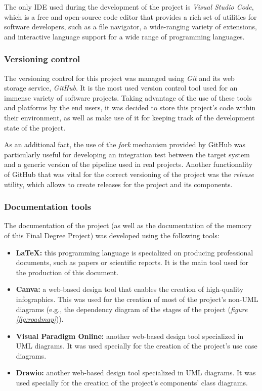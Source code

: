 The only \acrshort{IDE} used during the development of the project is \emph{Visual Studio Code}, which is a free and open-source code editor that provides a rich set of utilities
for software developers, such as a file navigator, a wide-ranging variety of extensions, and interactive language support for a wide range of programming languages.

\subsubsection{Versioning control}

The versioning control for this project was managed using \emph{Git} and its web storage service, \emph{GitHub}. It is the most used version control tool used for an immense variety of
software projects. Taking advantage of the use of these tools and platforms by the end users, it was decided to store this project's code within their environment, as well as make use of
it for keeping track of the development state of the project. 

As an additional fact, the use of the \emph{fork} mechanism provided by GitHub was particularly useful for developing an integration
test between the target system and a generic version of the pipeline used in real projects. Another functionality of GitHub that was vital for the correct versioning of the project was the
\emph{release} utility, which allows to create releases for the project and its components.

\subsubsection{Documentation tools}

The documentation of the project (as well as the documentation of the memory of this Final Degree Project) was developed using the following tools:

\begin{itemize}
    \item \textbf{\LaTeX: }this programming language is specialized on producing professional documents, such as papers or scientific reports. It is the main tool used
    for the production of this document.

    \item \textbf{Canva: }a web-based design tool that enables the creation of high-quality infographics. This was used for the creation of most of the project's non-UML
    diagrams (e.g., the dependency diagram of the stages of the project (\emph{figure \ref{fig:roadmap}})).

    \item \textbf{Visual Paradigm Online: }another web-based design tool specialized in UML diagrams. It was used specially for the creation of the project's use case diagrams.

    \item \textbf{Drawio: }another web-based design tool specialized in UML diagrams. It was used specially for the creation of the project's components' class diagrams.
\end{itemize}
